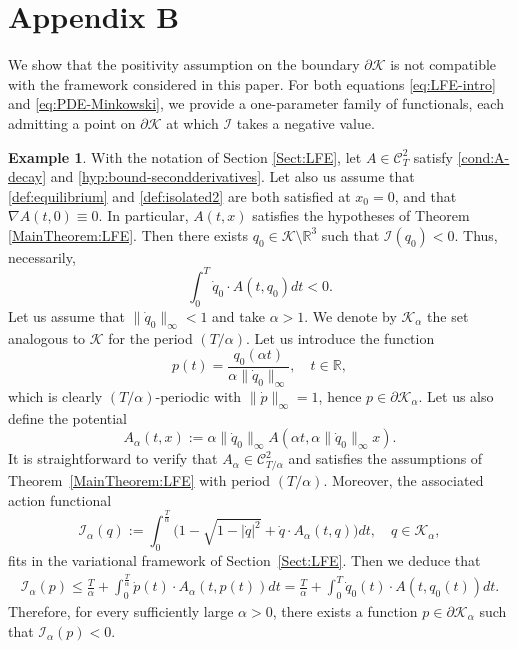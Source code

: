 \documentclass{article}
\newcommand{\boC}{\mathcal{C}}
\newcommand{\boK}{\mathcal{K}}
\newcommand{\boI}{\mathcal{I}}
\newcommand{\R}{\mathbb{R}}
\newcommand{\dq}{\dot{q}}
\newcommand{\dpp}{\dot{p}}
\theoremstyle{definition}
\newtheorem{example}{Example}[section]
\begin{document}
    
\section*{Appendix B}
\makeatletter
\def\@currentlabel{B} %
\makeatother
\gdef\theexample{B.\arabic{example}}
\label{Appendix-Boundary}
\setcounter{example}{0}
We show that the positivity assumption on the boundary $\partial\boK$ is not compatible with the framework considered in this paper. For both equations \eqref{eq:LFE-intro} and \eqref{eq:PDE-Minkowski}, we provide a one-parameter family of functionals, each admitting a point on $\partial\boK$ at which $\boI$ takes a negative value.
\begin{example}
    With the notation of Section \ref{Sect:LFE}, let $A\in \boC^2_T$ satisfy \eqref{cond:A-decay} and \eqref{hyp:bound-secondderivatives}. Let also us assume that \eqref{def:equilibrium} and \eqref{def:isolated2} are both satisfied at $x_0=0$, and that $\nabla A(t,0)\equiv0$. In particular, $A(t,x)$ satisfies the hypotheses of Theorem \ref{MainTheorem:LFE}. Then there exists $q_0\in\boK\setminus\R^3$ such that $\boI(q_0)<0$. Thus, necessarily,
    \[\int_0^T\dq_0\cdot A(t,q_0)dt<0.\]
    Let us assume that $\|\dq_0\|_\infty<1$ and take $\alpha>1$. We denote by $\boK_\alpha$ the set analogous to $\boK$ for the period $(T/\alpha)$. Let us introduce the function 
    \[p(t)=\dfrac{q_0(\alpha t)}{\alpha\|\dq_0\|_\infty} ,\quad t\in\R,\]
   which is clearly $(T/\alpha)$-periodic with $\|\dot p\|_\infty=1$, hence $p\in\partial\boK_\alpha$. Let us also define the potential
    \[A_{\alpha}(t,x):=\alpha\|\dq_0\|_\infty A\left(\alpha t,\alpha\|\dq_0\|_\infty x\right).\]
    It is straightforward to verify that $A_\alpha\in\boC^2_{T/\alpha}$ and satisfies the assumptions of Theorem~\ref{MainTheorem:LFE} with period $(T/\alpha)$. Moreover, the associated action functional
    \begin{equation}
        \boI_{\alpha}(q):=\int_0^\frac{T}{\alpha}\big(1-\sqrt{1-|\dot q|^2}+\dot q\cdot A_{\alpha}(t,q)\big)dt,\quad q\in\boK_\alpha,
    \end{equation}
    fits in the variational framework of Section~\ref{Sect:LFE}. Then
    we deduce that
    \begin{align*}
       \boI_\alpha(p)\leq\frac{T}{\alpha}+\int_0^{\frac{T}{\alpha}}\dpp(t)\cdot A_{\alpha}(t,p(t))dt=\frac{T}{\alpha}+\int_0^T\dq_0(t)\cdot A(t,q_0(t))dt.
    \end{align*}
    Therefore, for every sufficiently large $\alpha>0$, there exists a function $p\in\partial\boK_\alpha$ such that $\boI_\alpha(p)<0$.
\end{example}
\end{document}
